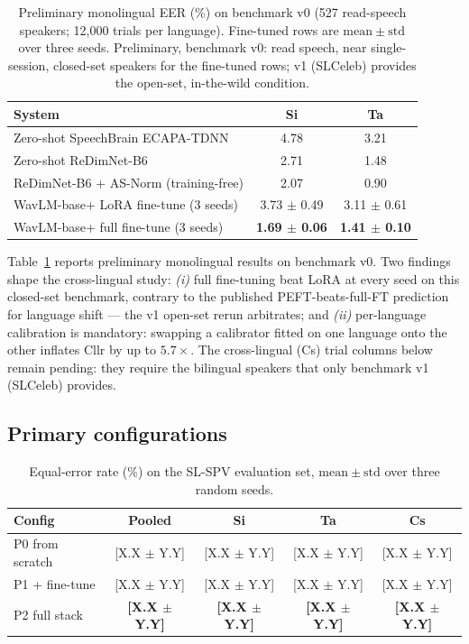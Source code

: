 \documentclass[11pt,a4paper]{article}
\begin{document}
\begin{table}[t]
\centering
\caption{Preliminary monolingual EER (\%) on benchmark v0 (527
read-speech speakers; 12{,}000 trials per language). Fine-tuned rows
are $\mathrm{mean} \pm \mathrm{std}$ over three seeds. Preliminary,
benchmark v0: read speech, near single-session, closed-set speakers
for the fine-tuned rows; v1 (SLCeleb) provides the open-set,
in-the-wild condition.}
\label{tab:prelim}
\begin{tabular}{lcc}
\toprule
\textbf{System} & \textbf{Si} & \textbf{Ta} \\
\midrule
Zero-shot SpeechBrain ECAPA-TDNN            & 4.78 & 3.21 \\
Zero-shot ReDimNet-B6                       & 2.71 & 1.48 \\
ReDimNet-B6 + AS-Norm (training-free)       & 2.07 & 0.90 \\
WavLM-base+ LoRA fine-tune (3 seeds)        & 3.73 $\pm$ 0.49 & 3.11 $\pm$ 0.61 \\
WavLM-base+ full fine-tune (3 seeds)        & \textbf{1.69 $\pm$ 0.06} & \textbf{1.41 $\pm$ 0.10} \\
\bottomrule
\end{tabular}
\end{table}

Table~\ref{tab:prelim} reports preliminary monolingual results on
benchmark v0. Two findings shape the cross-lingual study: \emph{(i)}
full fine-tuning beat LoRA at every seed on this closed-set benchmark,
contrary to the published PEFT-beats-full-FT prediction for language
shift --- the v1 open-set rerun arbitrates; and \emph{(ii)}
per-language calibration is mandatory: swapping a calibrator fitted on
one language onto the other inflates Cllr by up to $5.7\times$. The
cross-lingual (Cs) trial columns below remain pending: they require
the bilingual speakers that only benchmark v1 (SLCeleb) provides.

\subsection{Primary configurations}
\label{sec:exp:primary}

\begin{table}[t]
\centering
\caption{Equal-error rate (\%) on the SL-SPV evaluation set,
$\mathrm{mean} \pm \mathrm{std}$ over three random seeds.}
\label{tab:headline}
\begin{tabular}{lcccc}
\toprule
\textbf{Config} & \textbf{Pooled} & \textbf{Si} & \textbf{Ta} & \textbf{Cs} \\
\midrule
P0 from scratch  & [X.X $\pm$ Y.Y] & [X.X $\pm$ Y.Y] & [X.X $\pm$ Y.Y] & [X.X $\pm$ Y.Y] \\
P1 + fine-tune   & [X.X $\pm$ Y.Y] & [X.X $\pm$ Y.Y] & [X.X $\pm$ Y.Y] & [X.X $\pm$ Y.Y] \\
P2 full stack    & \textbf{[X.X $\pm$ Y.Y]} & \textbf{[X.X $\pm$ Y.Y]}
                 & \textbf{[X.X $\pm$ Y.Y]} & \textbf{[X.X $\pm$ Y.Y]} \\
\bottomrule
\end{tabular}
\end{table}
\end{document}
